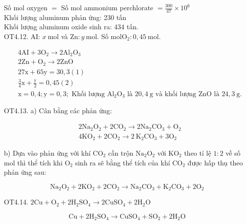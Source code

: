 \documentclass[10pt]{article}
\begin{document}
Số mol oxygen $=$ Số mol ammonium perchlorate $=\frac{300}{47} \times 10^{6}$\\
Khối lượng aluminum phản ứng: 230 tấn\\
Khối lượng aluminum oxide sinh ra: 434 tấn.\\
OT4.12. AI: $x \mathrm{~mol}$ và $\mathrm{Zn}: y \mathrm{~mol}$. Số $\mathrm{mol} \mathrm{O}_{2}: 0,45 \mathrm{~mol}$.

$$
\begin{aligned}
& 4 \mathrm{AI}+3 \mathrm{O}_{2} \rightarrow 2 \mathrm{Al}_{2} \mathrm{O}_{3} \\
& 2 \mathrm{Zn}+\mathrm{O}_{2} \rightarrow 2 \mathrm{ZnO} \\
& 27 \mathrm{x}+65 \mathrm{y}=30,3(1) \\
& \frac{3}{4} \mathrm{x}+\frac{\mathrm{y}}{2}=0,45(2) \\
& \mathrm{x}=0,4 ; \mathrm{y}=0,3 ; \text { Khối lượng } \mathrm{Al}_{2} \mathrm{O}_{3} \text { là } 20,4 \mathrm{~g} \text { và khối lượng } \mathrm{ZnO} \text { là } 24,3 \mathrm{~g} .
\end{aligned}
$$

OT4.13. a) Cân bằng các phản ứng:

$$
\begin{aligned}
& 2 \mathrm{Na}_{2} \mathrm{O}_{2}+2 \mathrm{CO}_{2} \rightarrow 2 \mathrm{Na}_{2} \mathrm{CO}_{3}+\mathrm{O}_{2} \\
& 4 \mathrm{KO}_{2}+2 \mathrm{CO}_{2} \rightarrow 2 \mathrm{~K}_{2} \mathrm{CO}_{3}+3 \mathrm{O}_{2}
\end{aligned}
$$

b) Dựa vào phản ứng với khí $\mathrm{CO}_{2}$ cần trộn $\mathrm{Na}_{2} \mathrm{O}_{2}$ với $\mathrm{KO}_{2}$ theo tỉ lệ $1: 2$ về số mol thì thể tích khi $\mathrm{O}_{2}$ sinh ra sẽ bằng thể tích của khí $\mathrm{CO}_{2}$ được hấp thụ theo phản ứng sau:

$$
\mathrm{Na}_{2} \mathrm{O}_{2}+2 \mathrm{KO}_{2}+2 \mathrm{CO}_{2} \rightarrow \mathrm{Na}_{2} \mathrm{CO}_{3}+\mathrm{K}_{2} \mathrm{CO}_{3}+2 \mathrm{O}_{2}
$$

OT4.14. $2 \mathrm{Cu}+\mathrm{O}_{2}+2 \mathrm{H}_{2} \mathrm{SO}_{4} \rightarrow 2 \mathrm{CuSO}_{4}+2 \mathrm{H}_{2} \mathrm{O}$


\begin{equation*}
\mathrm{Cu}+2 \mathrm{H}_{2} \mathrm{SO}_{4} \rightarrow \mathrm{CuSO}_{4}+\mathrm{SO}_{2}+2 \mathrm{H}_{2} \mathrm{O} \tag{1}
\end{equation*}
\end{document}
